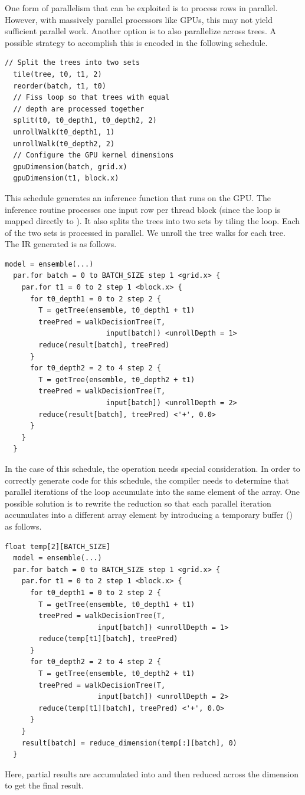 One form of parallelism that can be exploited is to process rows in 
parallel. However, with massively parallel processors like GPUs,
this may not yield sufficient parallel work. Another option is to also 
parallelize across trees. A possible strategy to accomplish this is 
encoded in the following schedule.
\begin{lstlisting}[style=c++]
  // Split the trees into two sets
  tile(tree, t0, t1, 2)
  reorder(batch, t1, t0)
  // Fiss loop so that trees with equal 
  // depth are processed together
  split(t0, t0_depth1, t0_depth2, 2)
  unrollWalk(t0_depth1, 1)
  unrollWalk(t0_depth2, 2)
  // Configure the GPU kernel dimensions
  gpuDimension(batch, grid.x)
  gpuDimension(t1, block.x)
\end{lstlisting}
This schedule generates an inference function that runs on the GPU. 
The inference routine processes one input row per thread block (since the 
loop is mapped directly to ).
It also splits the trees into two sets by tiling the  loop.
Each of the two sets is processed in parallel. We unroll the tree walks 
for each tree. The IR generated is as follows. 
\begin{lstlisting}[style=c++]
  model = ensemble(...)
  par.for batch = 0 to BATCH_SIZE step 1 <grid.x> {
    par.for t1 = 0 to 2 step 1 <block.x> {
      for t0_depth1 = 0 to 2 step 2 {
        T = getTree(ensemble, t0_depth1 + t1)
        treePred = walkDecisionTree(T, 
                        input[batch]) <unrollDepth = 1>
        reduce(result[batch], treePred)
      }
      for t0_depth2 = 2 to 4 step 2 {
        T = getTree(ensemble, t0_depth2 + t1)
        treePred = walkDecisionTree(T,
                        input[batch]) <unrollDepth = 2>
        reduce(result[batch], treePred) <'+', 0.0>
      }
    }
  }
\end{lstlisting}

In the case of this schedule, the 
operation needs special consideration. In order to correctly generate 
code for this schedule, the compiler needs to determine that parallel 
iterations of the  
loop accumulate into the same element of the  array.
One possible solution is to rewrite the reduction so that each parallel 
iteration accumulates into a different array element by introducing 
a temporary buffer () as follows.
\begin{lstlisting}[style=c++]
  float temp[2][BATCH_SIZE]
  model = ensemble(...)
  par.for batch = 0 to BATCH_SIZE step 1 <grid.x> {
    par.for t1 = 0 to 2 step 1 <block.x> {
      for t0_depth1 = 0 to 2 step 2 {
        T = getTree(ensemble, t0_depth1 + t1)
        treePred = walkDecisionTree(T, 
                      input[batch]) <unrollDepth = 1>
        reduce(temp[t1][batch], treePred)
      }
      for t0_depth2 = 2 to 4 step 2 {
        T = getTree(ensemble, t0_depth2 + t1)
        treePred = walkDecisionTree(T,
                      input[batch]) <unrollDepth = 2>
        reduce(temp[t1][batch], treePred) <'+', 0.0>
      }
    }
    result[batch] = reduce_dimension(temp[:][batch], 0)
  }
\end{lstlisting}
Here, partial results are accumulated into  and then
reduced across the  dimension to get the final result.

